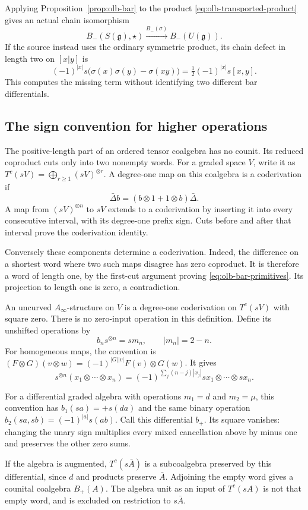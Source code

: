Applying Proposition~\ref{prop:olb-bar} to the product
\eqref{eq:olb-transported-product} gives an actual chain isomorphism
\[
 B_-(S(\mathfrak g),\star)\xrightarrow{B_-(\sigma)}B_-(U(\mathfrak g)).
\]
If the source instead uses the ordinary symmetric product, its
chain defect in length two on $[x|y]$ is
\[
 (-1)^{|x|}s\bigl(\sigma(x)\sigma(y)-\sigma(xy)\bigr)
 =\tfrac12(-1)^{|x|}s[x,y].
\]
This computes the missing term without identifying two different
bar differentials.

\subsection{The sign convention for higher operations}
\label{sec:olb-sign-convention}

The positive-length part of an ordered tensor coalgebra has no
counit.  Its reduced coproduct cuts only into two nonempty words.
For a graded space $V$, write it as
$T^c(sV)=\bigoplus_{r\geq1}(sV)^{\otimes r}$.
A degree-one map on this coalgebra is a coderivation if
\[
 \bar\Delta b=(b\otimes1+1\otimes b)\bar\Delta.
\]
A map from $(sV)^{\otimes n}$ to $sV$ extends to a coderivation by
inserting it into every consecutive interval, with its degree-one
prefix sign.  Cuts before and after that interval prove the
coderivation identity.

Conversely these components determine a coderivation.
Indeed, the difference on a shortest word where two such maps
disagree has zero coproduct.  It is therefore a word of length one,
by the first-cut argument proving \eqref{eq:olb-bar-primitives}.
Its projection to length one is zero, a contradiction.

An uncurved $A_\infty$-structure on $V$ is a degree-one coderivation
on $T^c(sV)$ with square zero. There is no zero-input operation in
this definition. Define its unshifted operations by
\[
 b_n s^{\otimes n}=s m_n,\qquad |m_n|=2-n.
\]
For homogeneous maps, the convention is
$(F\otimes G)(v\otimes w)=(-1)^{|G||v|}F(v)\otimes G(w)$.
It gives
\[
 s^{\otimes n}(x_1\otimes\cdots\otimes x_n)
 =(-1)^{\sum_j(n-j)|x_j|}sx_1\otimes\cdots\otimes sx_n.
\]

For a differential graded algebra with operations $m_1=d$ and
$m_2=\mu$, this convention has
$b_1(sa)=+s(da)$ and the same binary operation
$b_2(sa,sb)=(-1)^{|a|}s(ab)$.
Call this differential $b_+$.
Its square vanishes: changing the unary sign multiplies every
mixed cancellation above by minus one and preserves the other
zero sums.

If the algebra is augmented, $T^c(s\bar A)$ is a subcoalgebra
preserved by this differential, since $d$ and products preserve
$\bar A$.  Adjoining the empty word gives a counital coalgebra
$B_+(A)$.  The algebra unit as an input of $T^c(sA)$ is not that
empty word, and is excluded on restriction to $s\bar A$.

